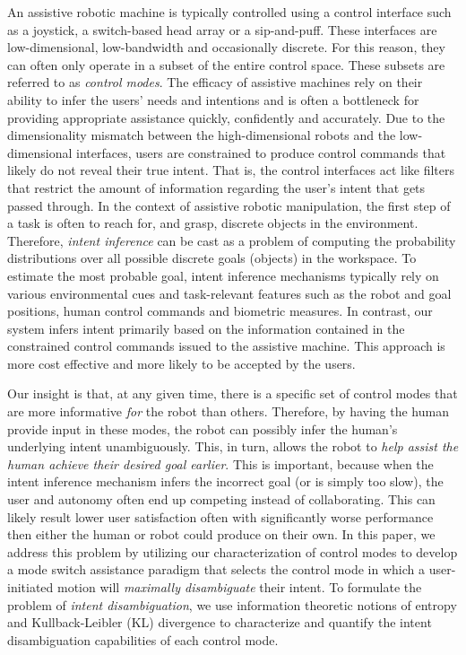 \documentclass[conference]{IEEEtran}
\begin{document}
An assistive robotic machine is typically controlled using a control interface such as a joystick, a switch-based head array or a sip-and-puff. These interfaces are low-dimensional, low-bandwidth and occasionally discrete. For this reason, they can often only operate in a subset of the entire control space. These subsets are referred to as \textit{control modes}. The efficacy of assistive machines rely on their ability to infer the users' needs and intentions and is often a bottleneck for providing appropriate assistance quickly, confidently and accurately. Due to the dimensionality mismatch between the high-dimensional robots and the low-dimensional interfaces, users are constrained to produce control commands that likely do not reveal their true intent. That is, the control interfaces act like filters that restrict the amount of information regarding the user's intent that gets passed through. 
In the context of assistive robotic manipulation, the first step of a task is often to reach for, and grasp, discrete objects in the environment. Therefore, \textit{intent inference} can be cast as a problem of computing the probability distributions over all possible discrete goals (objects) in the workspace. To estimate the most probable goal, intent inference mechanisms typically rely on various environmental cues and task-relevant features such as the robot and goal positions, human control commands and biometric measures. In contrast, our system infers intent primarily based on the information contained in the constrained control commands issued to the assistive machine. This approach is more cost effective and more likely to be accepted by the users. 

Our insight is that, at any given time, there is a specific set of control modes that are more informative \textit{for} the robot than others.  Therefore, by having the human provide input in these modes, the robot can possibly infer the human's underlying intent unambiguously. This, in turn, allows the robot to \textit{help assist the human achieve their desired goal earlier}.  This is important, because when the intent inference mechanism infers the incorrect goal (or is simply too slow), the user and autonomy often end up competing instead of collaborating. This can likely result lower user satisfaction often with significantly worse performance then either the human or robot could produce on their own.  In this paper, we address this problem by utilizing our characterization of control modes to develop a mode switch assistance paradigm that selects the control mode in which a user-initiated motion will \textit{maximally disambiguate} their intent.  To formulate the problem of \textit{intent disambiguation}, we use information theoretic notions of entropy and Kullback-Leibler (KL) divergence to characterize and quantify the intent disambiguation capabilities of each control mode.
\end{document}
